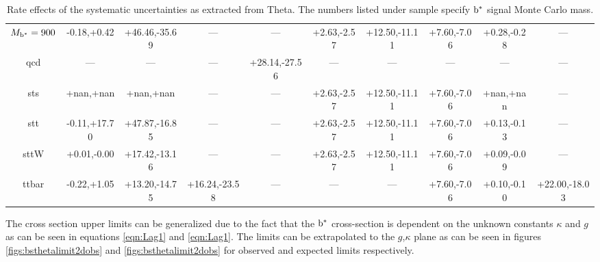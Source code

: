 \begin{table}
\begin{center}
{\begin{tabular}{|c||c|c|c|c|c|c|c|c|c|}
$M_{\mathrm{b}^{*}}=900$ & -0.18,+0.42 & +46.46,-35.69 & --- & --- & +2.63,-2.57 & +12.50,-11.11 & +7.60,-7.06 & +0.28,-0.28 & ---\\ 
qcd & --- & --- & --- & +28.14,-27.56 & --- & --- & --- & --- & ---\\ 
sts & +nan,+nan & +nan,+nan & --- & --- & +2.63,-2.57 & +12.50,-11.11 & +7.60,-7.06 & +nan,+nan & ---\\ 
stt & -0.11,+17.70 & +47.87,-16.85 & --- & --- & +2.63,-2.57 & +12.50,-11.11 & +7.60,-7.06 & +0.13,-0.13 & ---\\ 
sttW & +0.01,-0.00 & +17.42,-13.16 & --- & --- & +2.63,-2.57 & +12.50,-11.11 & +7.60,-7.06 & +0.09,-0.09 & ---\\ 
ttbar & -0.22,+1.05 & +13.20,-14.75 & +16.24,-23.58 & --- & --- & --- & +7.60,-7.06 & +0.10,-0.10 & +22.00,-18.03\\ 
\hline
\end{tabular}
}
\end{center}
\caption{Rate effects of the systematic uncertainties as extracted from Theta.  The numbers listed under sample specify $\mathrm{b}^{*}$ signal Monte Carlo mass.}
\label{table:bsnuisance}
\end{table}



The cross section upper limits can be generalized due to the fact that the $\mathrm{b}^{*}$ cross-section is dependent on the unknown constants $\kappa$ and $g$ as can be seen in equations \ref{eqn:Lag1} and \ref{eqn:Lag1}.
The limits can be extrapolated to the $g$,$\kappa$ plane as can be seen in figures \ref{figs:bsthetalimit2dobs} and \ref{figs:bsthetalimit2dobs} for observed and expected limits respectively.




